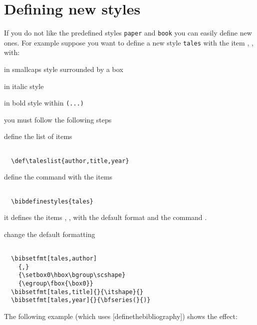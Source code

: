 \documentclass[a4paper,final,11pt]{article}
\begin{document}
\section{Defining new styles}
If you do not like the predefined styles \verb'paper' and \verb'book'
you can easily define new ones. For example suppose you want to 
define a new style \verb'tales' with the item ,
,  with:
\begin{desc}
  \item[\cmdname{author}] in smallcaps style surrounded by a box
  \item[\cmdname{title}] in italic style
  \item[\cmdname{year}]  in bold style  within \verb|(...)|
\end{desc}
you must follow the following steps
\begin{desc}
  \item[define the list of items]
\begin{verbatim}

  \def\taleslist{author,title,year}

\end{verbatim}
  \item[define the command \cmdname{talesref} with the items]
\begin{verbatim}

  \bibdefinestyles{tales}

\end{verbatim}
  it defines the items , ,
   with the default format and the command
  .
  \item[change the default formatting]
\begin{verbatim}

  \bibsetfmt[tales,author]
    {,}
    {\setbox0\hbox\bgroup\scshape}
    {\egroup\fbox{\box0}}
  \bibsetfmt[tales,title]{}{\itshape}{}
  \bibsetfmt[tales,year]{}{\bfseries(}{)}

\end{verbatim}
\end{desc}
%
The following example (which uses [definethebibliography])
shows the effect:
%
%
\end{document}

